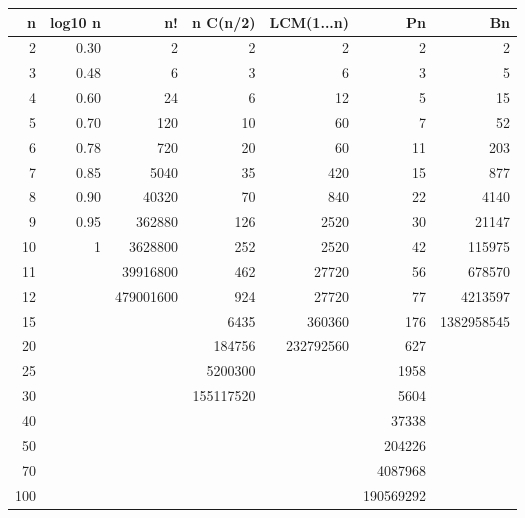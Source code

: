 \begin{table}
\centering
\begin{tabular}{|r|r|r|r|r|r|r|}
	\hline
	  n & log10 n & n! & n C(n/2) & LCM(1...n) & Pn & Bn \\
	\hline
	  2 & 0.30 & 2 & 2 & 2 & 2 & 2 \\
	\hline
	  3 & 0.48 & 6 & 3 & 6 & 3 & 5 \\
	\hline
	  4 & 0.60 & 24 & 6 & 12 & 5 & 15 \\
	\hline
	  5 & 0.70 & 120 & 10 & 60 & 7 & 52 \\
	\hline
	  6 & 0.78 & 720 & 20 & 60 & 11 & 203 \\
	\hline
	  7 & 0.85 & 5040 & 35 & 420 & 15 & 877 \\
	\hline
	  8 & 0.90 & 40320 & 70 & 840 & 22 & 4140 \\
	\hline
	  9 & 0.95 & 362880 & 126 & 2520 & 30 & 21147 \\
	\hline
	  10 & 1 & 3628800 & 252 & 2520 & 42 & 115975 \\
	\hline
	  11 &   & 39916800 & 462 & 27720 & 56 & 678570 \\
	\hline
	  12 &   & 479001600 & 924 & 27720 & 77 & 4213597 \\
	\hline
	  15 &   &   & 6435 & 360360 & 176 & 1382958545 \\
	\hline
	  20 &   &   & 184756 & 232792560 & 627 &  \\
	\hline
	  25 &   &   & 5200300 &   & 1958 &  \\
	\hline
	  30 &   &   & 155117520 &   & 5604 &  \\
	\hline
	  40 &   &   &   &   & 37338 &  \\
	\hline
	  50 &   &   &   &   & 204226 &  \\
	\hline
	  70 &   &   &   &   & 4087968 &  \\
	\hline
	  100 &   &   &   &   & 190569292 &  \\
	\hline
	\end{tabular}
\end{table}



